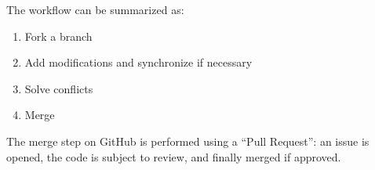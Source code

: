 \documentclass[onecolumn, oneside, a4paper, 11pt]{memoir}
\theoremstyle{remark}
\begin{document}
\begin{center}
\end{center}

The workflow can be summarized as:
\begin{enumerate}
\item Fork a branch
\item Add modifications and synchronize if necessary
\item Solve conflicts
\item Merge
\end{enumerate}
The merge step on GitHub is performed using a ``Pull Request'': an issue is opened, the code is subject to review, and finally merged if approved.
\end{document}
